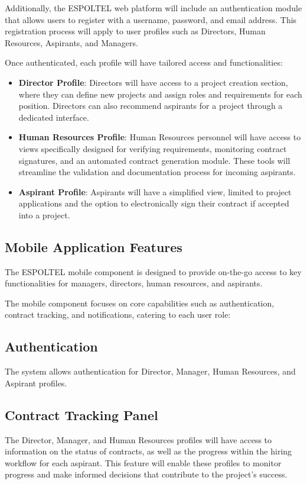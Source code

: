 \documentclass{scrreprt}
\begin{document}
Additionally, the ESPOLTEL web platform will include an authentication module that allows users to register with a username, password, and email address. This registration process will apply to user profiles such as Directors, Human Resources, Aspirants, and Managers.

Once authenticated, each profile will have tailored access and functionalities:

\begin{itemize}
    \item \textbf{Director Profile}: Directors will have access to a project creation section, where they can define new projects and assign roles and requirements for each position. Directors can also recommend aspirants for a project through a dedicated interface.

    \item \textbf{Human Resources Profile}: Human Resources personnel will have access to views specifically designed for verifying requirements, monitoring contract signatures, and an automated contract generation module. These tools will streamline the validation and documentation process for incoming aspirants.

    \item \textbf{Aspirant Profile}: Aspirants will have a simplified view, limited to project applications and the option to electronically sign their contract if accepted into a project.
\end{itemize}


\subsection{Mobile Application Features}

The ESPOLTEL mobile component is designed to provide on-the-go access to key functionalities for managers, directors, human resources, and aspirants.

The mobile component focuses on core capabilities such as authentication, contract tracking, and notifications, catering to each user role:

\subsection*{Authentication}
The system allows authentication for Director, Manager, Human Resources, and Aspirant profiles.

\subsection*{Contract Tracking Panel}
The Director, Manager, and Human Resources profiles will have access to information on the status of contracts, as well as the progress within the hiring workflow for each aspirant. This feature will enable these profiles to monitor progress and make informed decisions that contribute to the project’s success.
\end{document}
